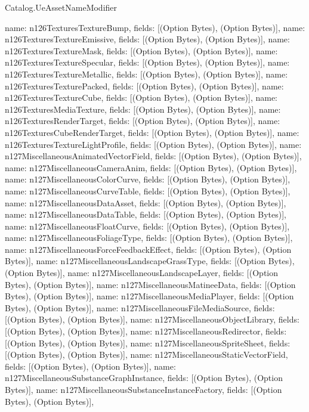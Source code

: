 \begin{lexlean}{Catalog.UeAssetNameModifier}
\begin{semanticmodule}
{    {name: n126TexturesTextureBump, fields: [(Option Bytes), (Option Bytes)]},
    {name: n126TexturesTextureEmissive, fields: [(Option Bytes), (Option Bytes)]},
    {name: n126TexturesTextureMask, fields: [(Option Bytes), (Option Bytes)]},
    {name: n126TexturesTextureSpecular, fields: [(Option Bytes), (Option Bytes)]},
    {name: n126TexturesTextureMetallic, fields: [(Option Bytes), (Option Bytes)]},
    {name: n126TexturesTexturePacked, fields: [(Option Bytes), (Option Bytes)]},
    {name: n126TexturesTextureCube, fields: [(Option Bytes), (Option Bytes)]},
    {name: n126TexturesMediaTexture, fields: [(Option Bytes), (Option Bytes)]},
    {name: n126TexturesRenderTarget, fields: [(Option Bytes), (Option Bytes)]},
    {name: n126TexturesCubeRenderTarget, fields: [(Option Bytes), (Option Bytes)]},
    {name: n126TexturesTextureLightProfile, fields: [(Option Bytes), (Option Bytes)]},
    {name: n127MiscellaneousAnimatedVectorField, fields: [(Option Bytes), (Option Bytes)]},
    {name: n127MiscellaneousCameraAnim, fields: [(Option Bytes), (Option Bytes)]},
    {name: n127MiscellaneousColorCurve, fields: [(Option Bytes), (Option Bytes)]},
    {name: n127MiscellaneousCurveTable, fields: [(Option Bytes), (Option Bytes)]},
    {name: n127MiscellaneousDataAsset, fields: [(Option Bytes), (Option Bytes)]},
    {name: n127MiscellaneousDataTable, fields: [(Option Bytes), (Option Bytes)]},
    {name: n127MiscellaneousFloatCurve, fields: [(Option Bytes), (Option Bytes)]},
    {name: n127MiscellaneousFoliageType, fields: [(Option Bytes), (Option Bytes)]},
    {name: n127MiscellaneousForceFeedbackEffect, fields: [(Option Bytes), (Option Bytes)]},
    {name: n127MiscellaneousLandscapeGrassType, fields: [(Option Bytes), (Option Bytes)]},
    {name: n127MiscellaneousLandscapeLayer, fields: [(Option Bytes), (Option Bytes)]},
    {name: n127MiscellaneousMatineeData, fields: [(Option Bytes), (Option Bytes)]},
    {name: n127MiscellaneousMediaPlayer, fields: [(Option Bytes), (Option Bytes)]},
    {name: n127MiscellaneousFileMediaSource, fields: [(Option Bytes), (Option Bytes)]},
    {name: n127MiscellaneousObjectLibrary, fields: [(Option Bytes), (Option Bytes)]},
    {name: n127MiscellaneousRedirector, fields: [(Option Bytes), (Option Bytes)]},
    {name: n127MiscellaneousSpriteSheet, fields: [(Option Bytes), (Option Bytes)]},
    {name: n127MiscellaneousStaticVectorField, fields: [(Option Bytes), (Option Bytes)]},
    {name: n127MiscellaneousSubstanceGraphInstance, fields: [(Option Bytes), (Option Bytes)]},
    {name: n127MiscellaneousSubstanceInstanceFactory, fields: [(Option Bytes), (Option Bytes)]},
}
\end{semanticmodule}
\end{lexlean}
